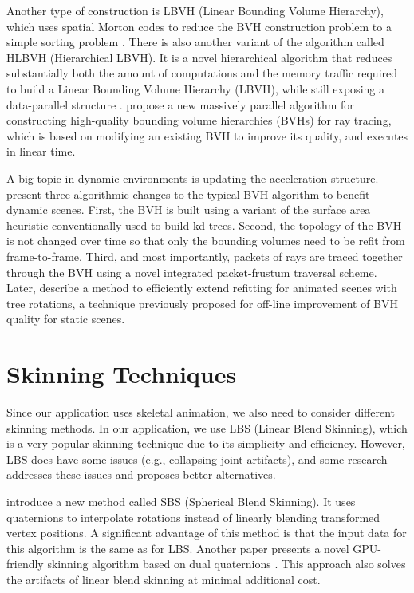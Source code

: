 Another type of construction is LBVH (Linear Bounding Volume Hierarchy), which uses spatial Morton codes to reduce the BVH construction problem to a simple sorting problem \parencite{lbvh}. There is also another variant of the algorithm called HLBVH (Hierarchical LBVH). It is a novel hierarchical algorithm that reduces substantially both the amount of computations and the memory traffic required to build a Linear Bounding Volume Hierarchy (LBVH), while still exposing a data-parallel structure \parencite{hlbvh}. \textcite{parallel-high-quality-bvh} propose a new massively parallel algorithm for constructing high-quality bounding volume hierarchies (BVHs) for ray tracing, which is based on modifying an existing BVH to improve its quality, and executes in linear time.

A big topic in dynamic environments is updating the acceleration structure. \textcite{bvh-refitting} present three algorithmic changes to the typical BVH algorithm to benefit dynamic scenes. First, the BVH is built using a variant of the surface area heuristic conventionally used to build kd-trees. Second, the topology of the BVH is not changed over time so that only the bounding volumes need to be refit from frame-to-frame. Third, and most importantly, packets of rays are traced together through the BVH using a novel integrated packet-frustum traversal scheme. Later, \textcite{fast-bvh-updates} describe a method to efficiently extend refitting for animated scenes with tree rotations, a technique previously proposed for off-line improvement of BVH quality for static scenes.

\section{Skinning Techniques}

Since our application uses skeletal animation, we also need to consider different skinning methods. In our application, we use LBS (Linear Blend Skinning), which is a very popular skinning technique due to its simplicity and efficiency. However, LBS does have some issues (e.g., collapsing-joint artifacts), and some research addresses these issues and proposes better alternatives.

\textcite{sbs} introduce a new method called SBS (Spherical Blend Skinning). It uses quaternions to interpolate rotations instead of linearly blending transformed vertex positions. A significant advantage of this method is that the input data for this algorithm is the same as for LBS. Another paper presents a novel GPU-friendly skinning algorithm based on dual quaternions \parencite{dual-quaternions}. This approach also solves the artifacts of linear blend skinning at minimal additional cost.

